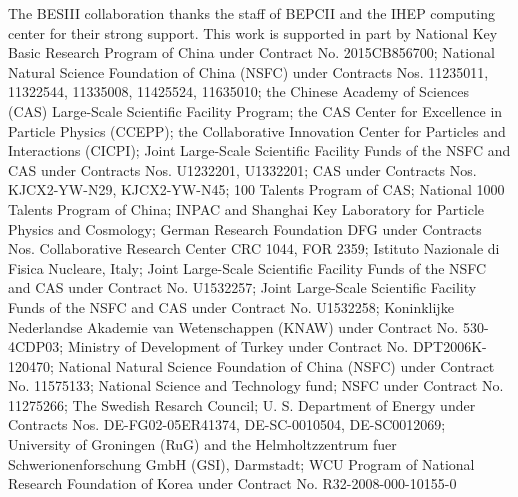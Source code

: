 \documentclass[aps,prd,twocolumn,showpacs,floatfix,byrevtex]{revtex4-1}
\begin{document}
The BESIII collaboration thanks the staff of BEPCII and the IHEP
computing center for their strong support. This work is supported in
part by National Key Basic Research Program of China under Contract
No. 2015CB856700; National Natural Science Foundation of China (NSFC)
under Contracts Nos. 11235011, 11322544, 11335008, 11425524, 11635010;
the Chinese Academy of Sciences (CAS) Large-Scale Scientific Facility
Program; the CAS Center for Excellence in Particle Physics (CCEPP);
the Collaborative Innovation Center for Particles and Interactions
(CICPI); Joint Large-Scale Scientific Facility Funds of the NSFC and
CAS under Contracts Nos. U1232201, U1332201; CAS under Contracts
Nos. KJCX2-YW-N29, KJCX2-YW-N45; 100 Talents Program of CAS; National
1000 Talents Program of China; INPAC and Shanghai Key Laboratory for
Particle Physics and Cosmology; German Research Foundation DFG under
Contracts Nos. Collaborative Research Center CRC 1044, FOR 2359;
Istituto Nazionale di Fisica Nucleare, Italy; Joint Large-Scale
Scientific Facility Funds of the NSFC and CAS under Contract
No. U1532257; Joint Large-Scale Scientific Facility Funds of the NSFC
and CAS under Contract No. U1532258; Koninklijke Nederlandse Akademie
van Wetenschappen (KNAW) under Contract No. 530-4CDP03; Ministry of
Development of Turkey under Contract No. DPT2006K-120470; National
Natural Science Foundation of China (NSFC) under Contract
No. 11575133; National Science and Technology fund; NSFC under
Contract No. 11275266; The Swedish Resarch Council; U. S. Department
of Energy under Contracts Nos. DE-FG02-05ER41374, DE-SC-0010504,
DE-SC0012069; University of Groningen (RuG) and the Helmholtzzentrum
fuer Schwerionenforschung GmbH (GSI), Darmstadt; WCU Program of
National Research Foundation of Korea under Contract
No. R32-2008-000-10155-0
\end{document}
